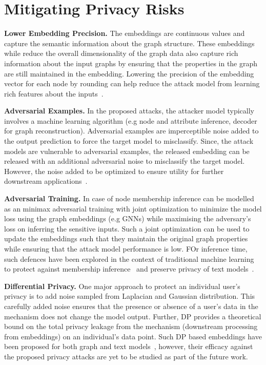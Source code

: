 \section{Mitigating Privacy Risks}\label{discuss}

\textbf{Lower Embedding Precision.} The embeddings are continuous values and capture the semantic information about the graph structure.
These embeddings while reduce the overall dimensionality of the graph data also capture rich information about the input graphs by ensuring that the properties in the graph are still maintained in the embedding.
Lowering the precision of the embedding vector for each node by rounding can help reduce the attack model from learning rich features about the inputs~\cite{membershipinf,nlp}.

\textbf{Adversarial Examples.} In the proposed attacks, the attacker model typically involves a machine learning algorithm (e.g node and attribute inference, decoder for graph reconstruction).
Adversarial examples are imperceptible noise added to the output prediction to force the target model to misclassify.
Since, the attack models are vulnerable to adversarial examples, the released embedding can be released with an additional adversarial noise to misclassify the target model.
However, the noise added to be optimized to ensure utility for further downstream applications~\cite{attriguard,memguard}.

\textbf{Adversarial Training.} In case of node membership inference can be modelled as an minimax adversarial training with joint optimization to minimize the model loss using the graph embeddings (e.g GNNs) while maximising the adversary's loss on inferring the sensitive inputs.
Such a joint optimization can be used to update the embeddings such that they maintain the original graph properties while ensuring that the attack model performance is low.
FOr inference time, such defences have been explored in the context of traditional machine learning to protect against membership inference~\cite{advreg} and preserve privacy of text models~\cite{textembleak}.

\textbf{Differential Privacy.} One major approach to protect an individual user's privacy is to add noise sampled from Laplacian and Gaussian distribution.
This carefully added noise ensures that the presence or absence of a user's data in the mechanism does not change the model output.
Further, DP provides a theoretical bound on the total privacy leakage from the mechanism (downstream processing from embeddings) on an individual's data point.
Such DP based embeddings have been proposed for both graph and text models~\cite{dptext,dpne}, however, their efficacy against the proposed privacy attacks are yet to be studied as part of the future work.
